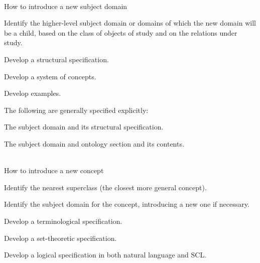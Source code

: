 \begin{frame}{\\How to introduce a new subject domain}
	\topline
	\justifying
	\vspace{8mm}
	\begin{textitemize}
		\item Identify the higher-level subject domain or domains of which the new domain will be a child, based on the class of objects of study and on the relations under study.
		\item Develop a structural specification.
		\item Develop a system of concepts.
		\item Develop examples.
	\end{textitemize}
	\bigskip
	The following are generally specified explicitly:
	\begin{textitemize}
		\item The subject domain and its structural specification.
		\item The subject domain and ontology section and its contents.
	\end{textitemize}
\end{frame}

\begin{frame}{\\How to introduce a new concept}
	\topline
	\justifying
	\vspace{8mm}
	\begin{textitemize}
		\item Identify the nearest superclass (the closest more general concept).
		\item Identify the subject domain for the concept, introducing a new one if necessary.
		\item Develop a terminological specification.
		\item Develop a set-theoretic specification.
		\item Develop a logical specification in both natural language and SCL.
	\end{textitemize}
\end{frame}
